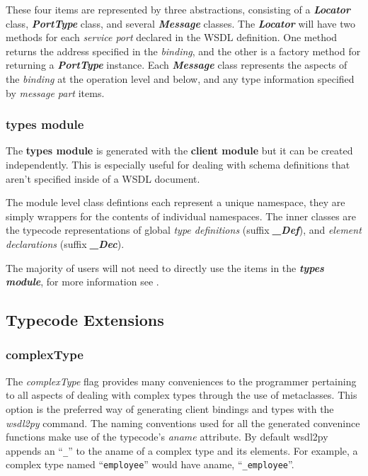 These four items are represented by three abstractions, consisting of a
{\it \bfseries Locator} class, {\it \bfseries PortType} class, and several 
{\it \bfseries Message} classes. The {\it \bfseries Locator} will have two methods for each {\it service port} declared in
the WSDL definition.  One method returns the address specified in the {\it binding}, and the other is a factory method for returning a {\it \bfseries PortType}
instance.  Each {\it \bfseries Message} class represents the aspects of the {\it binding}
at the operation level and below, and any type information specified by {\it message part} items.

\subsubsection{types module}
The {\bfseries types module} is generated with the {\bfseries client module} but
it can be created independently.  This is especially useful for dealing with
schema definitions that aren't specified inside of a WSDL document.  

The module level class defintions each represent a unique namespace, they are
simply wrappers for the contents of individual namespaces.  The inner classes
are the typecode representations of global {\it type definitions} (suffix {\it \bfseries _Def}), 
and {\it element declarations} (suffix {\it \bfseries _Dec}).

The majority of users will not need to directly use the items in the 
{\it \bfseries types module}, for more information see 
\label{section:Advanced Usage Patterns}.


\subsection{Typecode Extensions}

\subsubsection{complexType}
\label{subsubsection:complexType}
The {\it complexType} flag provides many conveniences to the programmer
pertaining to all aspects of dealing with complex types through the use of 
metaclasses. This option is the preferred way of generating client bindings and
types with the {\it wsdl2py} command.  The naming conventions used for all the
generated convenince functions make use of the typecode's {\it aname} attribute.
 By default wsdl2py appends an ``\verb!_!'' to the aname of a complex type and
 its elements.  For example, a complex type named ``\verb!employee!'' would have
 aname, ``\verb!_employee!''.

